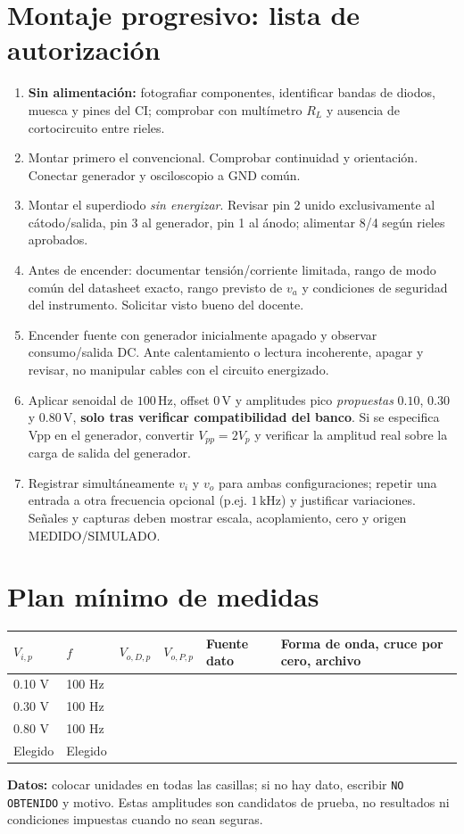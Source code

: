 \documentclass[10pt,a4paper]{article}
\begin{document}
\section{Montaje progresivo: lista de autorización}
\begin{enumerate}[label=\textbf{Paso \arabic*.}]
\item \textbf{Sin alimentación:} fotografiar componentes, identificar bandas de diodos, muesca y pines del CI; comprobar con multímetro $R_L$ y ausencia de cortocircuito entre rieles.
\item Montar primero el convencional. Comprobar continuidad y orientación. Conectar generador y osciloscopio a GND común.
\item Montar el superdiodo \emph{sin energizar}. Revisar pin 2 unido exclusivamente al cátodo/salida, pin 3 al generador, pin 1 al ánodo; alimentar 8/4 según rieles aprobados.
\item Antes de encender: documentar tensión/corriente limitada, rango de modo común del datasheet exacto, rango previsto de $v_a$ y condiciones de seguridad del instrumento. Solicitar visto bueno del docente.
\item Encender fuente con generador inicialmente apagado y observar consumo/salida DC. Ante calentamiento o lectura incoherente, apagar y revisar, no manipular cables con el circuito energizado.
\item Aplicar senoidal de $100\,\mathrm{Hz}$, offset $0\,\mathrm{V}$ y amplitudes pico \emph{propuestas} $0.10$, $0.30$ y $0.80\,\mathrm{V}$, \textbf{solo tras verificar compatibilidad del banco}. Si se especifica Vpp en el generador, convertir $V_{pp}=2V_p$ y verificar la amplitud real sobre la carga de salida del generador.
\item Registrar simultáneamente $v_i$ y $v_o$ para ambas configuraciones; repetir una entrada a otra frecuencia opcional (p.ej. $1\,\mathrm{kHz}$) y justificar variaciones. Señales y capturas deben mostrar escala, acoplamiento, cero y origen MEDIDO/SIMULADO.
\end{enumerate}
\section{Plan mínimo de medidas}
\begin{tabularx}{\linewidth}{@{}P{1.4cm}P{1.5cm}P{1.7cm}P{1.6cm}P{1.6cm}Y@{}}\toprule
$V_{i,p}$ & $f$ & $V_{o,D,p}$ & $V_{o,P,p}$ & Fuente dato & Forma de onda, cruce por cero, archivo \\  V & 100 Hz & & & & \\  V & 100 Hz & & & & \\  V & 100 Hz & & & & \\ \midrule
Elegido & Elegido & & & & \\ \bottomrule\end{tabularx}
\textbf{Datos:} colocar unidades en todas las casillas; si no hay dato, escribir \texttt{NO OBTENIDO} y motivo. Estas amplitudes son candidatos de prueba, no resultados ni condiciones impuestas cuando no sean seguras.
\end{document}
